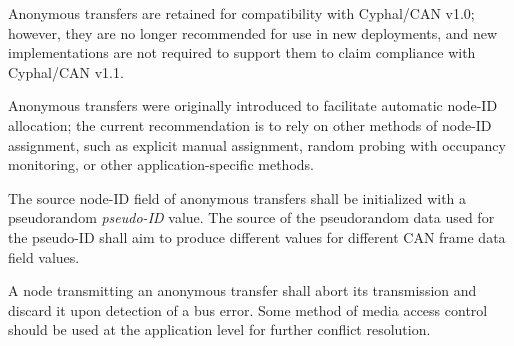 \begin{remark}
    Anonymous transfers are retained for compatibility with Cyphal/CAN v1.0; however, they are no longer recommended
    for use in new deployments, and new implementations are not required to support them to claim compliance with
    Cyphal/CAN v1.1.

    Anonymous transfers were originally introduced to facilitate automatic node-ID allocation;
    the current recommendation is to rely on other methods of node-ID assignment,
    such as explicit manual assignment, random probing with occupancy monitoring, or other application-specific methods.
\end{remark}

The source node-ID field of anonymous transfers shall be initialized with a pseudorandom \emph{pseudo-ID} value.
The source of the pseudorandom data used for the pseudo-ID shall aim to produce different values
for different CAN frame data field values.

A node transmitting an anonymous transfer shall abort its transmission and discard it upon detection of a bus error.
Some method of media access control should be used at the application level for further conflict resolution.

